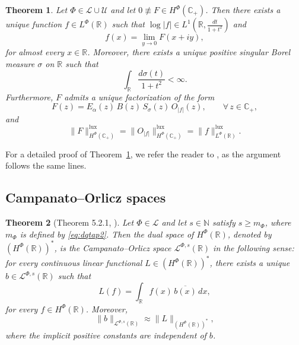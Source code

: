 \documentclass[a4paper,12pt,intlimits,oneside]{amsart}
\newtheorem{theorem}{Theorem}[section]
\theoremstyle{definition}
\numberwithin{equation}{section}
\theoremstyle{definition}
\begin{document}
\begin{theorem}\label{pro:main0apaaql0}
Let $\Phi \in \mathscr{L} \cup \mathscr{U}$ and let $0 \not\equiv F \in H^{\Phi}(\mathbb{C}_{+})$. Then there exists a unique function
$f \in L^{\Phi}(\mathbb{R})$ such that $\log |f| \in L^{1}\!\left(\mathbb{R}, \frac{dt}{1+t^{2}}\right)$
and
$$f(x)=\lim_{y\to 0}F(x+iy), $$
for almost every $x \in \mathbb{R}$. Moreover, there exists a unique positive singular Borel measure $\sigma$ on $\mathbb{R}$ such that
\[
\int_{\mathbb{R}}\frac{d\sigma(t)}{1+t^{2}}<\infty.
\]
Furthermore, $F$ admits a unique factorization of the form
\begin{equation}\label{eq:phiaq6ql3de}
F(z) = E_{\alpha}(z)\, B(z)\, S_{\sigma}(z)\, O_{|f|}(z), 
\qquad \forall\, z \in \mathbb{C}_{+},
\end{equation}
and
\[
\|F\|_{H^{\Phi}(\mathbb{C}_{+})}^{\mathrm{lux}}
= \|O_{|f|}\|_{H^{\Phi}(\mathbb{C}_{+})}^{\mathrm{lux}}
= \|f\|_{L^{\Phi}(\mathbb{R})}^{\mathrm{lux}}.
\]
\end{theorem}

\medskip

For a detailed proof of Theorem~\ref{pro:main0apaaql0}, we refer the reader to \cite[Theorem 13.15]{javadmas}, as the argument follows the same lines.







\subsection{Campanato--Orlicz spaces}

\begin{theorem}[Theorem 5.2.1, \cite{yangLiangKy}]\label{pro:main2aaoamdp}
Let $\Phi \in \mathscr{L}$ and let $s \in \mathbb{N}$ satisfy $s \geq m_{\Phi}$, where $m_{\Phi}$ is defined by \eqref{eq:dqtap2}. Then the dual space of $H^{\Phi}(\mathbb{R})$, denoted by $(H^{\Phi}(\mathbb{R}))^*$, is the Campanato--Orlicz space $\mathcal{L}^{\Phi,s}(\mathbb{R})$ in the following sense: for every continuous linear functional $L \in (H^{\Phi}(\mathbb{R}))^*$, there exists a unique  $b \in \mathcal{L}^{\Phi,s}(\mathbb{R})$ such that
\[
L(f)=\int_{\mathbb{R}} f(x)\,\overline{b(x)}\,dx,
\]
for every $f \in H^{\Phi}(\mathbb{R})$. Moreover,
\[
\|b\|_{\mathcal{L}^{\Phi,s}(\mathbb{R})}
\approx
\|L\|_{(H^{\Phi}(\mathbb{R}))^*},
\]
where the implicit positive constants are independent of $b$.
\end{theorem}
\end{document}
